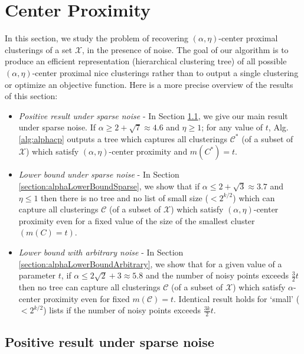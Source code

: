 \documentclass[orivec]{llncs}
\newcommand{\mc}{\mathcal}
\begin{document}
\section{Center Proximity}
\label{section:cp}

In this section, we study the problem of recovering $(\alpha, \eta)$-center proximal clusterings of a set $\mc X$, in the presence of noise. The goal of our algorithm is to produce an efficient representation (hierarchical clustering tree) of all possible $(\alpha, \eta)$-center proximal nice clusterings rather than to output a single clustering or optimize an objective function. Here is a more precise overview of the results of this section: 
\begin{itemize}[nolistsep,noitemsep,leftmargin=*]
\item  {\it Positive result under sparse noise} - In Section \ref{section:positiveResultSparseNoise}, we give our main result under sparse noise. If $\alpha \ge 2 + \sqrt{7} \approx 4.6$ and $\eta \ge 1$; for any value of $t$, Alg.\ref{alg:alphacp} outputs a tree which captures all clusterings $\mc C^*$ (of a subset of $\mc X$) which satisfy $(\alpha, \eta)$-center proximity and $m(C^*)=t$.
\item  {\it Lower bound under sparse noise} - In Section \ref{section:alphaLowerBoundSparse}, we show that if $\alpha \le 2 + \sqrt{3} \approx 3.7$ and $\eta \le 1$ then there is no tree and no list of small size ($< 2^{k/2}$) which can capture all clusterings $\mc C$ (of a subset of $\mc X$) which satisfy $(\alpha, \eta)$-center proximity even for a fixed value of the size of the smallest cluster $(m(C) = t)$.
\item {\it Lower bound with arbitrary noise} - In Section \ref{section:alphaLowerBoundArbitrary}, we show that for a given value of a parameter $t$, if $\alpha \le 2\sqrt{2} + 3 \approx 5.8$ and the number of noisy points exceeds $\frac{3}{2}t$ then no tree can capture all clusterings $\mc C$ (of a subset of $\mc X$) which satisfy $\alpha$-center proximity even for fixed $m(\mc C) = t$. Identical result holds for `small' ($<2^{k/2}$) lists if the number of noisy points exceeds $\frac{3k}{2}t$.
\end{itemize} 

\subsection{Positive result under sparse noise}
\label{section:positiveResultSparseNoise}
\end{document}
